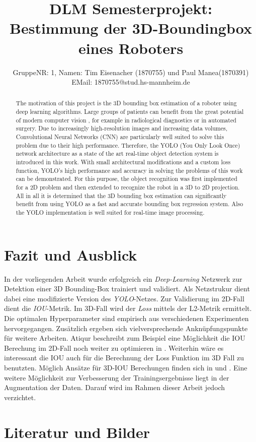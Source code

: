 \documentclass{article}
\title{DLM Semesterprojekt: Bestimmung der 3D-Boundingbox eines Roboters}
\author{%
  GruppeNR: 1, Namen: Tim Eisenacher (1870755) und Paul Manea(1870391) \\
  EMail: 1870755@stud.hs-mannheim.de
}
\begin{document}

\maketitle


\begin{abstract}
The motivation of this project is the 3D bounding box estimation of a roboter using deep learning algorithms. Large groups of patients can benefit from the great potential of modern computer vision , for example in radiological diagnostics or in  automated surgery. Due to increasingly high-resolution images and increasing data volumes, Convolutional Neural Networks (CNN) are particularly well suited to solve this problem due to their high performance. Therefore, the YOLO (You Only Look Once) network architecture as a state of the art real-time object detection system is introduced in this work. With small architectural modifications and a custom loss function, YOLO's high performance and accuracy in solving the problems of this work can be demonstrated. For this purpose, the object recognition was first implemented for a 2D problem and then extended to recognize the robot in a 3D to 2D projection. All in all it is determined that the 3D bounding box estimation can signiﬁcantly beneﬁt from
using YOLO as a fast and accurate bounding box regression system. Also the YOLO implementation is well suited for real-time image processing.	
\end{abstract}

\newpage
 



 


\newpage
\section{Fazit und Ausblick}

In der vorliegenden Arbeit wurde erfolgreich ein \textit{Deep-Learning} Netzwerk zur Detektion einer 3D Bounding-Box trainiert und validiert. Als Netzstrukur dient dabei eine modifizierte Version des \textit{YOLO}-Netzes. Zur Validierung im 2D-Fall dient die \textit{IOU}-Metrik. Im 3D-Fall wird der \textit{Loss} mittels der L2-Metrik ermittelt. Die optimalen Hyperparameter sind empirisch aus verschiedenen Experimenten hervorgegangen.
Zusätzlich ergeben sich vielversprechende Anknüpfungspunkte für weitere Arbeiten. Atiqur beschreibt zum Beispiel eine Möglichkeit die IOU Berechung im 2D-Fall noch weiter zu optimieren in \cite{Atiqur}. Weiterhin wäre es interessant die IOU auch für die Berechnung der Loss Funktion im 3D Fall zu benutzten. Möglich Ansätze für 3D-IOU Berechungen finden sich in \cite{Xu2019} und \cite{Mousavian1612}. Eine weitere Möglichkeit zur Verbesserung der Trainingsergebnisse liegt in der Augmentation der Daten. Darauf wird im Rahmen dieser Arbeit jedoch verzichtet.


\section{Literatur und Bilder}



\listoffigures
\end{document}
